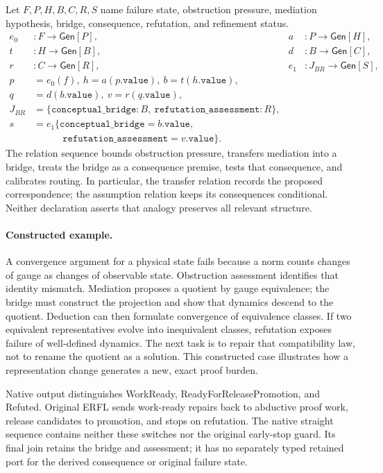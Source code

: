 Let $F,P,H,B,C,R,S$ name failure state, obstruction pressure, mediation
hypothesis, bridge, consequence, refutation, and refinement status.
\[
\begin{aligned}
 e_0 &:F\to\mathsf{Gen}[P],&a &:P\to\mathsf{Gen}[H],\\
 t &:H\to\mathsf{Gen}[B],&d &:B\to\mathsf{Gen}[C],\\
 r &:C\to\mathsf{Gen}[R],&e_1 &:J_{BR}\to\mathsf{Gen}[S],\\
 p&=e_0(f),\ h=a(p.\mathtt{value}),\ b=t(h.\mathtt{value}),\\
 q&=d(b.\mathtt{value}),\ v=r(q.\mathtt{value}),\\
 J_{BR}&=\{\mathtt{conceptual\_bridge}:B,\ \mathtt{refutation\_assessment}:R\},\\
 s&=e_1\bigl\{\mathtt{conceptual\_bridge}=b.\mathtt{value},\\
  &\hspace{3em}\mathtt{refutation\_assessment}=v.\mathtt{value}\bigr\}.
\end{aligned}
\]
The relation sequence bounds obstruction pressure, transfers mediation into a
bridge, treats the bridge as a consequence premise, tests that consequence,
and calibrates routing. In particular, the transfer relation records the proposed
correspondence; the assumption relation keeps its consequences conditional.
Neither declaration asserts that analogy preserves all relevant structure.

\paragraph{Constructed example.}
A convergence argument for a physical state fails because a norm counts changes
of gauge as changes of observable state. Obstruction assessment identifies that
identity mismatch. Mediation proposes a quotient by gauge equivalence; the bridge
must construct the projection and show that dynamics descend to the quotient.
Deduction can then formulate convergence of equivalence classes. If two equivalent
representatives evolve into inequivalent classes, refutation exposes failure of
well-defined dynamics. The next task is to repair that compatibility law, not to
rename the quotient as a solution. This constructed case illustrates how a
representation change generates a new, exact proof burden.

Native output distinguishes WorkReady, ReadyForReleasePromotion, and Refuted.
Original ERFL sends work-ready repairs back to abductive proof work, release
candidates to promotion, and stops on refutation. The native straight sequence
contains neither these switches nor the original early-stop guard. Its final
join retains the bridge and assessment; it has no separately typed retained port
for the derived consequence or original failure state.

